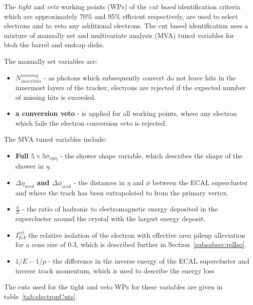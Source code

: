 The \emph{tight} and \emph{veto} working points (WPs) of the \emph{cut based} identification criteria which are approximately  70\% and 95\% efficient respectively, are used to select electrons and to veto any additional electrons.
The cut based identification uses a mixture of manually set and multivariate analysis (MVA) tuned variables for btoh the barrel and endcap disks.

The manually set variables are:
\begin{itemize}
\item \textbf{$N^{missing}_{inner hits}$} - as photons which subsequently convert do not leave hits in the innermost layers of the tracker, electrons are rejected if the expected number of missing hits is exceeded.
\item \textbf{a conversion veto} - is applied for all working points, where any electron which fails the electron conversion veto is rejected.
\end{itemize}

The MVA tuned variables include:
\begin{itemize}
\item \textbf{Full $5 \times 5 \sigma_{i\eta i\eta}$} - the shower shape variable, which describes the shape of the shower in $\eta$.
\item \textbf{$\Delta \eta_{seed}$ and $\Delta \phi_{seed}$} - the distances in $\eta$ and $\phi$ between the ECAL supercluster and where the track has been extrapolated to from the primary vertex.
\item \textbf{$\frac{h}{E}$} - the ratio of hadronic to electromagnetic energy deposited in the supercluster around the crystal with the largest energy deposit.
\item \textbf{$I^{rel}_{EA}$} the relative isolation of the electron with effective area pileup alleviation for a cone size of 0.3, which is described further in Section~\ref{subsubsec:relIso}.
\item \textbf{$1/E - 1/p$} - the difference in the inverse energy of the ECAL supercluster and inverse track momentum, which is used to describe the energy loss 
\end{itemize}

The cuts used for the tight and veto WPs for these variables are given in table~\ref{tab:electronCuts}.

